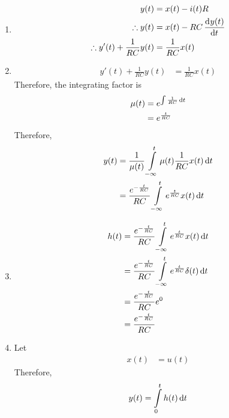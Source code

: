 \documentclass[fleqn, a4paper, 11pt, oneside]{amsart}
\theoremstyle{definition}
\theoremstyle{theorem}
\begin{document}
\begin{solution}
	\begin{enumerate}[leftmargin=*]
		\item
			\begin{align*}
				y(t)                                  & = x(t) - i(t) R            \\
				\therefore y(t)                       & = x(t) - R C \dod{y(t)}{t} \\
				\therefore y'(t) + \frac{1}{R C} y(t) & = \frac{1}{R C} x(t)       \\
			\end{align*}
		\item
			\begin{align*}
				y'(t) + \frac{1}{R C} y(t) & = \frac{1}{R C} x(t)
			\end{align*}
			Therefore, the integrating factor is
			\begin{align*}
				\mu(t) & = e^{\int \frac{1}{R C} \dif t} \\
                                       & = e^{\frac{t}{R C}}
			\end{align*}
			Therefore,
			\begin{align*}
				y(t) & = \frac{1}{\mu(t)} \int\limits_{-\infty}^{t} \mu(t) \frac{1}{R C} x(t) \dif t \\
                                     & = \frac{e^{-\frac{t}{R C}}}{R C} \int\limits_{-\infty}^{t} e^{\frac{t}{R C}} x(t) \dif t
			\end{align*}
		\item
			\begin{align*}
				h(t) & = \frac{e^{-\frac{t}{R C}}}{R C} \int\limits_{-\infty}^{t} e^{\frac{t}{R C}} x(t) \dif t      \\
                                     & = \frac{e^{-\frac{t}{R C}}}{R C} \int\limits_{-\infty}^{t} e^{\frac{t}{R C}} \delta(t) \dif t \\
                                     & = \frac{e^{-\frac{t}{R C}}}{R C} e^{0}                                                        \\
                                     & = \frac{e^{-\frac{t}{R C}}}{R C}
			\end{align*}
		\item
			Let
			\begin{align*}
				x(t) & = u(t)
			\end{align*}
			Therefore,
			\begin{align*}
				y(t) & = \int\limits_{0}^{t} h(t) \dif t                            \\

\end{align*}
\end{enumerate}
\end{solution}
\end{document}
